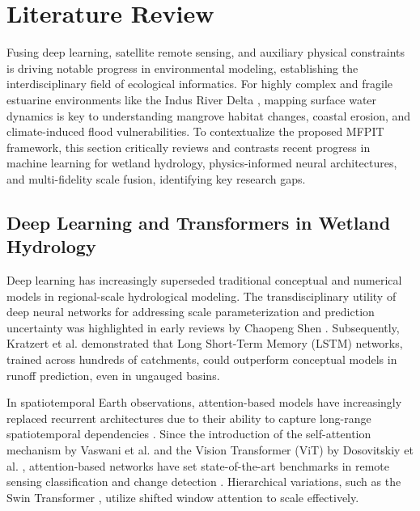 \documentclass[journal]{IEEEtran}
\begin{document}
\section{Literature Review}
Fusing deep learning, satellite remote sensing, and auxiliary physical constraints is driving notable progress in environmental modeling, establishing the interdisciplinary field of ecological informatics. For highly complex and fragile estuarine environments like the Indus River Delta \cite{haider_gridded_2025}, mapping surface water dynamics is key to understanding mangrove habitat changes, coastal erosion, and climate-induced flood vulnerabilities. To contextualize the proposed MFPIT framework, this section critically reviews and contrasts recent progress in machine learning for wetland hydrology, physics-informed neural architectures, and multi-fidelity scale fusion, identifying key research gaps.

\subsection{Deep Learning and Transformers in Wetland Hydrology}
Deep learning has increasingly superseded traditional conceptual and numerical models in regional-scale hydrological modeling. The transdisciplinary utility of deep neural networks for addressing scale parameterization and prediction uncertainty was highlighted in early reviews by Chaopeng Shen \cite{shen_transdisciplinary_2018}. Subsequently, Kratzert et al. \cite{kratzert_toward_2019, kratzert_rainfallrunoff_2021} demonstrated that Long Short-Term Memory (LSTM) networks, trained across hundreds of catchments, could outperform conceptual models in runoff prediction, even in ungauged basins. 

In spatiotemporal Earth observations, attention-based models have increasingly replaced recurrent architectures due to their ability to capture long-range spatiotemporal dependencies \cite{sit_comprehensive_2020, lees_benchmarking_2021}. Since the introduction of the self-attention mechanism by Vaswani et al. \cite{vaswani_attention_2017} and the Vision Transformer (ViT) by Dosovitskiy et al. \cite{dosovitskiy_image_2021}, attention-based networks have set state-of-the-art benchmarks in remote sensing classification and change detection \cite{bazi_vision_2021}. Hierarchical variations, such as the Swin Transformer \cite{liu_swin_2021}, utilize shifted window attention to scale effectively. 
\end{document}
